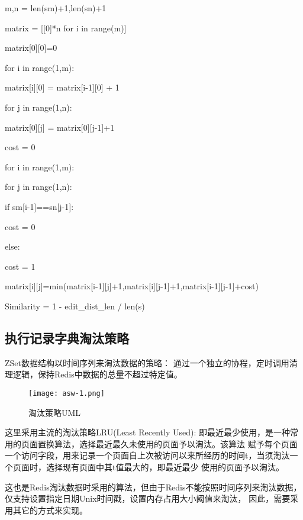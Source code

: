 \begin{algorithm}[h]
    \SetAlgoLined

    m,n = len(sm)+1,len(sn)+1

    matrix = [[0]*n for i in range(m)]

    matrix[0][0]=0

    for i in range(1,m):

    matrix[i][0] = matrix[i-1][0] + 1

    for j in range(1,n):

    matrix[0][j] = matrix[0][j-1]+1

    cost = 0

    for i in range(1,m):

    for j in range(1,n):

    if sm[i-1]==sn[j-1]:

    cost = 0

    else:

    cost = 1

    matrix[i][j]=min(matrix[i-1][j]+1,matrix[i][j-1]+1,matrix[i-1][j-1]+cost)

    Similarity = 1 - edit\_dist\_len / len(s)

\end{algorithm}

\subsection{执行记录字典淘汰策略}
ZSet数据结构以时间序列来淘汰数据的策略： 通过一个独立的协程，定时调用清理逻辑，保持Redis中数据的总量不超过特定值。

\begin{figure}[H]
    \centering
    \texttt{[image: asw-1.png]}
    \caption{淘汰策略UML}
    \label{fig:淘汰策略UML}
\end{figure}

这里采用主流的淘汰策略LRU(Least Recently Used): 即最近最少使用，是一种常用的页面置换算法，选择最近最久未使用的页面予以淘汰。该算法
赋予每个页面一个访问字段，用来记录一个页面自上次被访问以来所经历的时间t，当须淘汰一个页面时，选择现有页面中其t值最大的，即最近最少
使用的页面予以淘汰\cite{landman2021selfoptimizing}。

这也是Redis淘汰数据时采用的算法，但由于Redis不能按照时间序列来淘汰数据，仅支持设置指定日期Unix时间戳，设置内存占用大小阈值来淘汰，
因此，需要采用其它的方式来实现。

